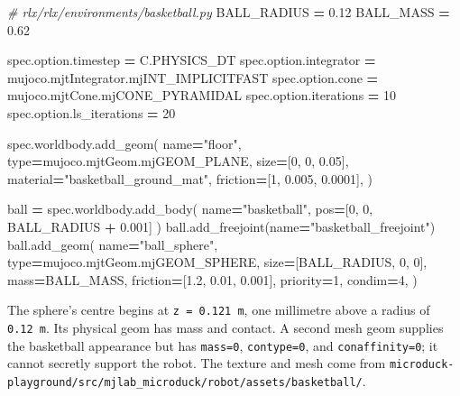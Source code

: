 \documentclass[
  american,
  11pt,
  letterpaper,
]{article}
\newenvironment{Shaded}{\begin{snugshade}}{\end{snugshade}}
\newcommand{\BuiltInTok}[1]{#1}
\newcommand{\CommentTok}[1]{\textcolor[rgb]{0.56,0.35,0.01}{\textit{#1}}}
\newcommand{\DecValTok}[1]{\textcolor[rgb]{0.00,0.00,0.81}{#1}}
\newcommand{\FloatTok}[1]{\textcolor[rgb]{0.00,0.00,0.81}{#1}}
\newcommand{\NormalTok}[1]{#1}
\newcommand{\OperatorTok}[1]{\textcolor[rgb]{0.81,0.36,0.00}{\textbf{#1}}}
\newcommand{\StringTok}[1]{\textcolor[rgb]{0.31,0.60,0.02}{#1}}
\renewenvironment{Shaded}{\par\smallskip}{\par\smallskip}
\begin{document}
\begin{Shaded}
\begin{Highlighting}[]
\CommentTok{\# rlx/rlx/environments/basketball.py}
\NormalTok{BALL\_RADIUS }\OperatorTok{=} \FloatTok{0.12}
\NormalTok{BALL\_MASS }\OperatorTok{=} \FloatTok{0.62}

\NormalTok{spec.option.timestep }\OperatorTok{=}\NormalTok{ C.PHYSICS\_DT}
\NormalTok{spec.option.integrator }\OperatorTok{=}\NormalTok{ mujoco.mjtIntegrator.mjINT\_IMPLICITFAST}
\NormalTok{spec.option.cone }\OperatorTok{=}\NormalTok{ mujoco.mjtCone.mjCONE\_PYRAMIDAL}
\NormalTok{spec.option.iterations }\OperatorTok{=} \DecValTok{10}
\NormalTok{spec.option.ls\_iterations }\OperatorTok{=} \DecValTok{20}

\NormalTok{spec.worldbody.add\_geom(}
\NormalTok{    name}\OperatorTok{=}\StringTok{"floor"}\NormalTok{, }\BuiltInTok{type}\OperatorTok{=}\NormalTok{mujoco.mjtGeom.mjGEOM\_PLANE,}
\NormalTok{    size}\OperatorTok{=}\NormalTok{[}\DecValTok{0}\NormalTok{, }\DecValTok{0}\NormalTok{, }\FloatTok{0.05}\NormalTok{], material}\OperatorTok{=}\StringTok{"basketball\_ground\_mat"}\NormalTok{,}
\NormalTok{    friction}\OperatorTok{=}\NormalTok{[}\DecValTok{1}\NormalTok{, }\FloatTok{0.005}\NormalTok{, }\FloatTok{0.0001}\NormalTok{],}
\NormalTok{)}

\NormalTok{ball }\OperatorTok{=}\NormalTok{ spec.worldbody.add\_body(}
\NormalTok{    name}\OperatorTok{=}\StringTok{"basketball"}\NormalTok{, pos}\OperatorTok{=}\NormalTok{[}\DecValTok{0}\NormalTok{, }\DecValTok{0}\NormalTok{, BALL\_RADIUS }\OperatorTok{+} \FloatTok{0.001}\NormalTok{]}
\NormalTok{)}
\NormalTok{ball.add\_freejoint(name}\OperatorTok{=}\StringTok{"basketball\_freejoint"}\NormalTok{)}
\NormalTok{ball.add\_geom(}
\NormalTok{    name}\OperatorTok{=}\StringTok{"ball\_sphere"}\NormalTok{, }\BuiltInTok{type}\OperatorTok{=}\NormalTok{mujoco.mjtGeom.mjGEOM\_SPHERE,}
\NormalTok{    size}\OperatorTok{=}\NormalTok{[BALL\_RADIUS, }\DecValTok{0}\NormalTok{, }\DecValTok{0}\NormalTok{], mass}\OperatorTok{=}\NormalTok{BALL\_MASS,}
\NormalTok{    friction}\OperatorTok{=}\NormalTok{[}\FloatTok{1.2}\NormalTok{, }\FloatTok{0.01}\NormalTok{, }\FloatTok{0.001}\NormalTok{], priority}\OperatorTok{=}\DecValTok{1}\NormalTok{, condim}\OperatorTok{=}\DecValTok{4}\NormalTok{,}
\NormalTok{)}
\end{Highlighting}
\end{Shaded}

The sphere's centre begins at \texttt{z\ =\ 0.121\ m}, one millimetre
above a radius of \texttt{0.12\ m}. Its physical geom has mass and
contact. A second mesh geom supplies the basketball appearance but has
\texttt{mass=0}, \texttt{contype=0}, and \texttt{conaffinity=0}; it
cannot secretly support the robot. The texture and mesh come from
\texttt{microduc\allowbreak{}k-\allowbreak{}playgrou\allowbreak{}nd/\allowbreak{}src/\allowbreak{}mjlab\_\allowbreak{}microduc\allowbreak{}k/\allowbreak{}robot/\allowbreak{}assets/\allowbreak{}basketba\allowbreak{}ll/\allowbreak{}}.
\end{document}
